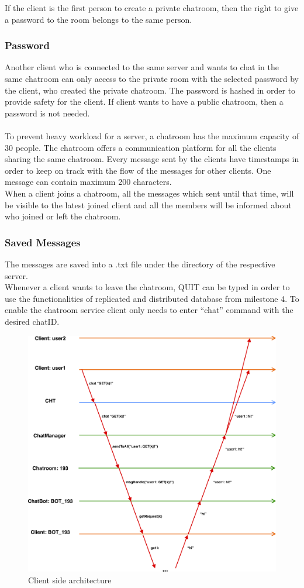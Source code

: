 If the client is the first person to create a private chatroom, then the right to give a password to the room belongs to the same person.
\subsubsection{Password}
\label{sec:groupchat_executionoftheworkflow_chatrooms_password}

Another client who is connected to the same server and wants to chat in the same chatroom can only access to the private room with the selected password by the client, who created the private chatroom. The password is hashed in order to provide safety for the client. If client wants to have a public chatroom, then a password is not needed.\\
\\
To prevent heavy workload for a server, a chatroom has the maximum capacity of 30 people. The chatroom offers a communication platform for all the clients sharing the same chatroom. Every message sent by the clients have timestamps in order to keep on track with the flow of the messages for other clients. One message can contain maximum 200 characters.\\
When a client joins a chatroom, all the messages which sent until that time, will be visible to the latest joined client and all the members will be informed about who joined or left the chatroom. 
\subsubsection{Saved Messages}
\label{sec:groupchat_executionoftheworkflow_savedmessages}

The messages are saved into a .txt file under the directory of the respective server.\\

Whenever a client wants to leave the chatroom, QUIT can be typed in order to use the functionalities of replicated and distributed database from milestone 4. To enable the chatroom service client only needs to enter “chat” command with the desired chatID. 

\begin{figure}[h]
	\centering
	\includegraphics[width=\linewidth]{figures/chat_graph.png}
	\caption{Client side architecture}
\end{figure}



